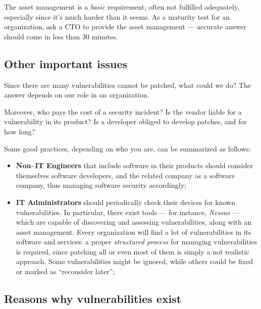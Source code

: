 \documentclass[10pt]{extreport}
\begin{document}
The asset management is a \emph{basic} requirement; often not fulfilled
adequately, especially since it's much harder than it seems. As a maturity test
for an organization, ask a CTO to provide the asset management --- accurate
answer should come in less than 30 minutes.

\subsection{Other important issues}

Since there are many vulnerabilities cannot be patched, what could we do? The
answer depends on our role in an organization.

Moreover, who pays the cost of a security incident? Is the vendor liable for a
vulnerability in its product? Is a developer obliged to develop patches, and
for how long?

Some good practices, depending on who you are, can be summarized as follows:

\begin{itemize}
    \item \textbf{Non--IT Engineers} that include software in their products
        should consider themselves software developers, and the related company
        as a software company, thus managing software security accordingly;
    \item \textbf{IT Administrators} should periodically check their devices
        for known vulnerabilities. In particular, there exist tools --- for
        instance, \emph{Nessus} --- which are capable of discovering and
        assessing vulnerabilities, along with an asset management. Every
        organization will find a lot of vulnerabilities in its software and
        services: a proper \emph{structured process} for managing
        vulnerabilities is required, since patching all or even most of them is
        simply a not realistic approach. Some vulnerabilities might be ignored,
        while others could be fixed or marked as ``reconsider later'';
\end{itemize}


\subsection{Reasons why vulnerabilities exist}
\end{document}
